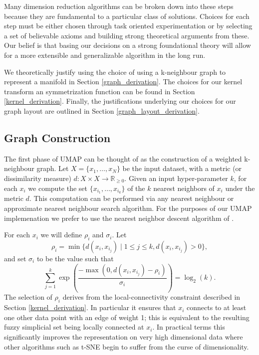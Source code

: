 \documentclass[12pt]{article}
\begin{document}
Many dimension reduction algorithms can be broken down into these steps because they are fundamental to a particular class of solutions.  Choices for each step must be either chosen through task oriented experimentation or by selecting a set of believable axioms and building strong theoretical arguments from these.  Our belief is that basing our decisions on a strong foundational theory will allow for a more extensible and generalizable algorithm in the long run.

We theoretically justify using the choice of using a k-neighbour graph to represent a manifold in Section {\ref{graph_derivation}}.  The choices for our kernel transform an symmetrization function can be found in Section {\ref{kernel_derivation}}. Finally, the justifications underlying our choices for our graph layout are outlined in Section {\ref{graph_layout_derivation}}.

\subsection{Graph Construction}

The first phase of UMAP can be thought of as the construction of a weighted k-neighbour graph. Let $X  = \{x_1,\ldots,x_N\}$ be the input dataset, with a metric (or dissimilarity measure) $d:X\times X \to \mathbb{R}_{\geq 0}$. Given an input hyper-parameter $k$, for each $x_i$ we compute the set $\{x_{i_1},\ldots, x_{i_k}\}$ of the $k$ nearest neighbors of $x_i$ under the metric $d$. This computation can be performed via any nearest neighbour or approximate nearest neighbour search algorithm.  For the purposes of our UMAP implemenation we prefer to use the nearest neighbor descent algorithm of \cite{DongNearestNeighbour}.

For each $x_i$ we will define $\rho_i$ and $\sigma_i$. Let 
\[
\rho_i = \min \{ d(x_i, x_{i_j}) \mid 1\leq j\leq k, d(x_i, x_{i_j}) > 0\},
\]
and set $\sigma_i$ to be the value such that
\[
\sum_{j=1}^k \exp\left(\frac{-\max(0, d(x_i, x_{i_j}) - \rho_i)}{\sigma_i}\right) = \log_2(k).
\]
The selection of $\rho_i$ derives from the local-connectivity constraint described in Section {\ref{kernel_derivation}}. In particular it ensures that $x_i$ connects to at least one other data point with an edge of weight 1; this is equivalent to the resulting fuzzy simplicial set being locally connected at $x_i$. In practical terms this significantly improves the representation on very high dimensional data where other algorithms such as t-SNE begin to suffer from the curse of dimensionality.
\end{document}
